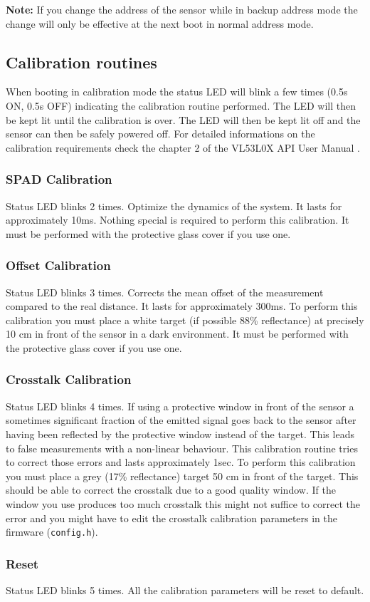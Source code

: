 \textbf{Note:} If you change the \iic address of the sensor while in backup address mode the change will only be effective at the next boot in normal \iic address mode.

\subsection{Calibration routines}
When booting in calibration mode the status LED will blink a few times (0.5s ON, 0.5s OFF) indicating the calibration routine performed. The LED will then be kept lit until the calibration is over. The LED will then be kept lit off and the sensor can then be safely powered off. For detailed informations on the calibration requirements check the chapter 2 of the VL53L0X API User Manual \cite{tofAPI}.

\subsubsection{SPAD Calibration}
Status LED blinks 2 times. Optimize the dynamics of the system. It lasts for approximately 10ms. Nothing special is required to perform this calibration. It must be performed with the protective glass cover if you use one.

\subsubsection{Offset Calibration}
Status LED blinks 3 times. Corrects the mean offset of the measurement compared to the real distance. It lasts for approximately 300ms. To perform this calibration you must place a white target (if possible 88\% reflectance) at precisely 10 cm in front of the sensor in a dark environment. It must be performed with the protective glass cover if you use one.

\subsubsection{Crosstalk Calibration}
Status LED blinks 4 times.
If using a protective window in front of the sensor a sometimes significant fraction of the emitted signal goes back to the sensor after having been reflected by the protective window instead of the target. This leads to false measurements with a non-linear behaviour.
This calibration routine tries to correct those errors and lasts approximately 1sec. To perform this calibration you must place a grey (17\% reflectance) target 50 cm in front of the target. This should be able to correct the crosstalk due to a good quality window. If the window you use produces too much crosstalk this might not suffice to correct the error and you might have to edit the crosstalk calibration parameters in the firmware (\texttt{config.h}).


\subsubsection{Reset}
Status LED blinks 5 times.
All the calibration parameters will be reset to default.